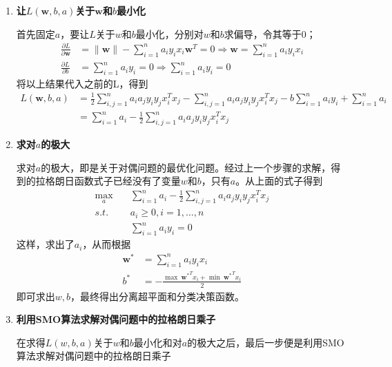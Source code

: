 \begin{enumerate}
	\item \textbf{让$L(\boldsymbol{w},b,a)$关于$\boldsymbol{w}$和$b$最小化}
	
	首先固定$a$，要让$L$关于$w$和$b$最小化，分别对$w$和$b$求偏导，令其等于0；
	\begin{equation}
	\begin{aligned}
	\frac{\partial L}{\partial \boldsymbol{w}} &= \lVert \boldsymbol{w}\rVert - \sum_{i = 1}^n a_iy_ix_i \boldsymbol{w}^T = 0 \Rightarrow  \boldsymbol{w} = \sum_{i = 1}^n a_iy_ix_i  \\
	\frac{\partial L}{\partial b} &= \sum_{i = 1}^n a_iy_i = 0\Rightarrow  \sum_{i = 1}^n a_iy_i  = 0
	\end{aligned}
	\end{equation}
	将以上结果代入之前的L，得到
	\begin{equation}
	\begin{aligned}
	L(\boldsymbol{w},b,a) &= \frac{1}{2}\sum_{i,j=1}^na_ia_jy_iy_jx_i^Tx_j - \sum_{i,j=1}^na_ia_jy_iy_jx_i^Tx_j - b\sum_{i = 1}^n a_iy_i + \sum_{i = 1}^na_i \\
	&= \sum _{i = 1}^n a_i - \frac{1}{2}\sum_{i,j=1}^na_ia_jy_iy_jx_i^Tx_j
	\end{aligned}
	\end{equation}
	\item \textbf{求对$a$的极大}
	
	求对$a$的极大，即是关于对偶问题的最优化问题。经过上一个步骤的求解，得到的拉格朗日函数式子已经没有了变量$w$和$b$，只有$a$。从上面的式子得到
	\begin{equation}
	\begin{aligned}
	\mathop{\mathrm{max}}\limits_a \quad &\sum _{i = 1}^n a_i - \frac{1}{2}\sum_{i,j=1}^na_ia_jy_iy_jx_i^Tx_j \\
	s.t. \quad &a_i \geq 0,i = 1,\dots, n \\
	&\sum_{i = 1}^n a_iy_i  = 0
	\end{aligned}
	\end{equation}
	这样，求出了$a_i$，从而根据
	\begin{equation}
	\begin{aligned}
	\boldsymbol{w}^* &= \sum_{i = 1}^n a_iy_ix_i \\
	b^* &= -\frac{\mathop{\mathrm{max}}\ {\boldsymbol{w}^*}^T x_i + \mathop{\mathrm{min}}\ {\boldsymbol{w}^*}^T x_i}{2} 
	\end{aligned}
	\end{equation}
	即可求出$w,b$，最终得出分离超平面和分类决策函数。
	\item \textbf{利用SMO算法求解对偶问题中的拉格朗日乘子}
	
	在求得$L(w,b,a)$关于$w$和$b$最小化和对$a$的极大之后，最后一步便是利用SMO算法求解对偶问题中的拉格朗日乘子	
\end{enumerate}
